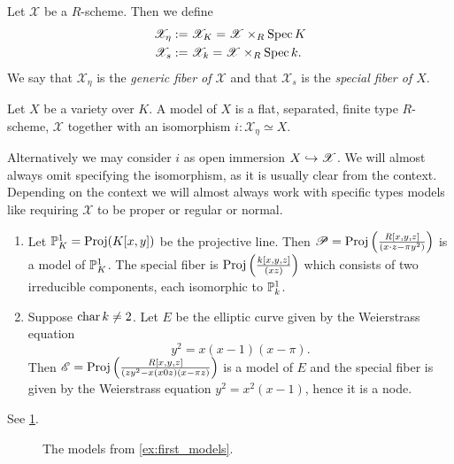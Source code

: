 \begin{definition}
	Let $\mathscr X$ be a $R$-scheme. 
	Then we define 
	\begin{align*}
		\mathscr X_\eta &:= \mathscr X_K = \mathscr X \times_R \operatorname{Spec} K \\
		\mathscr X_s &:= \mathscr X_k = \mathscr X \times_R \operatorname{Spec} k 
	.\end{align*}
	We say that $\mathscr X_\eta$ is the \emph{generic fiber of $\mathscr X$} and that $\mathscr X_s$ is the \emph{special fiber of $X$}. 
\end{definition}

\begin{definition}
	Let $X$ be a variety over $K$.  
	A model of $X$ is a flat, separated, finite type $R$-scheme, $\mathscr X$ together with an isomorphism $i: \mathscr X_\eta \simeq X$.
\end{definition}
Alternatively we may consider $i$ as open immersion $X\hookrightarrow \mathscr X$. 
We will almost always omit specifying the isomorphism, as it is usually clear from the context. 
Depending on the context we will almost always work with specific types models like requiring $\mathscr X$ to be proper or regular or normal.

\begin{example}\label{ex:first_models}
	\begin{enumerate}
		\item Let $\mathbb{P}^{1}_K = \operatorname{Proj}(K[x, y])$ be the projective line. 
			Then $\mathscr P = \operatorname{Proj}\left(\frac{R[x, y, z]}{(x\cdot z - \pi y^2)}\right)$ is a model of $\mathbb{P}^{1}_K$. 
			The special fiber is $\operatorname{Proj}\left( \frac{k[x, y, z]}{(xz)} \right) $ which consists of two irreducible components, each isomorphic to $\mathbb{P}^{1}_k$.  
		\item Suppose $\operatorname{char} k \ne 2$. Let $E$ be the elliptic curve given by the Weierstrass equation \[
				y^2 = x (x -1)(x-\pi)
		.\] 
		Then $\mathscr E = \operatorname{Proj} \left( \frac{R[x, y, z]}{(zy^2 - x(x0z)(x-\pi z)} \right) $ is a model of $E$ and the special fiber is given by the Weierstrass equation $y^2 = x^2 (x-1)$, hence it is a node. 
	\end{enumerate}
	See \cref{fig:first_examples_of_models}.
\end{example}

\begin{figure}[h]
    \centering
    \caption{The models from \cref{ex:first_models}.}
    \label{fig:first_examples_of_models}
\end{figure}

